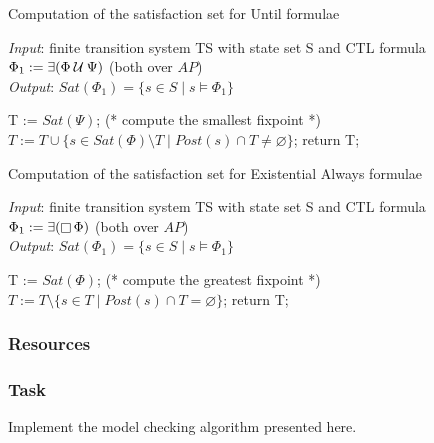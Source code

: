 \documentclass{article}
\begin{document}
\begin{algorithm}[H]
    \caption{Computation of the satisfaction set for Until formulae}
    \hspace*{\algorithmicindent} \emph{Input}: finite transition system TS with state set S and CTL formula $\Phi_1 := \exists (\Phi \mathbin{\mathcal{U}} \Psi)$ (both over $AP$) \\
    \hspace*{\algorithmicindent} \emph{Output}: $Sat(\Phi_1) = \{ s \in S \mid s \vDash \Phi_1 \}$
    \begin{algorithmic}[1]
        \State T := $Sat(\Psi)$; (* compute the smallest fixpoint *)
            \State $ T := T \cup \{ s \in Sat(\Phi) \setminus T \mid Post(s) \cap T \neq \varnothing \} $;
        \EndWhile
    \State return T;
    \end{algorithmic}
\end{algorithm}

\begin{algorithm}[H]
    \caption{Computation of the satisfaction set for Existential Always formulae}
    \hspace*{\algorithmicindent} \emph{Input}: finite transition system TS with state set S and CTL formula $\Phi_1 := \exists (\mathop{\square} \Phi)$ (both over $AP$) \\
    \hspace*{\algorithmicindent} \emph{Output}: $Sat(\Phi_1) = \{ s \in S \mid s \vDash \Phi_1  \}$
    \begin{algorithmic}[1]
        \State T := $Sat(\Phi)$; (* compute the greatest fixpoint *)
            \State $ T := T \setminus \{ s \in T \mid Post(s) \cap T = \varnothing \} $;
        \EndWhile
    \State return T;
    \end{algorithmic}
\end{algorithm}
\subsubsection{Resources}
\cite[Paragraph 6.4]{BaKa}

\color{red}
\subsubsection*{Task}
Implement the model checking algorithm presented here.
\color{black}
\end{document}

